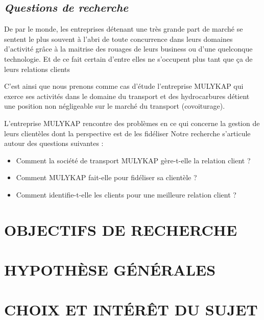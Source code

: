         \subsection[Questions de recherche]{\textit{Questions de recherche}}
        De par le monde, les entreprises détenant une très grande part de marché
        se sentent le plus souvent à l’abri de toute concurrence dans leurs domaines d’activité
        grâce à la maitrise des rouages de leurs business ou
        d’une quelconque technologie. \cite*{Rouviere2010} Et de ce fait certain
        d’entre elles ne s’occupent plus tant que ça de leurs relations clients
        \newline

        C’est ainsi que nous prenons comme cas d’étude l’entreprise MULYKAP qui exerce ses activités dans le domaine
        du transport et des hydrocarbures détient
        une position non négligeable sur le marché du transport (covoiturage).
        \newline

        L’entreprise MULYKAP rencontre des problèmes en ce qui concerne
        la gestion de leurs clientèles dont la perspective est de les
        fidéliser
        Notre recherche s’articule autour des questions suivantes :
        \begin{itemize}
            \item Comment la société de transport MULYKAP gère-t-elle
            la relation client ?
            \item Comment MULYKAP fait-elle pour fidéliser sa clientèle ?
            \item Comment identifie-t-elle les clients pour une
            meilleure relation client ?
        \end{itemize}

    \section[Objectifs de recherche]{OBJECTIFS DE RECHERCHE}

    \section[Hyposthèses générales]{HYPOTHÈSE GÉNÉRALES}

    \section[Choix et interet du sujet]{CHOIX ET INTÉRÊT DU SUJET}
